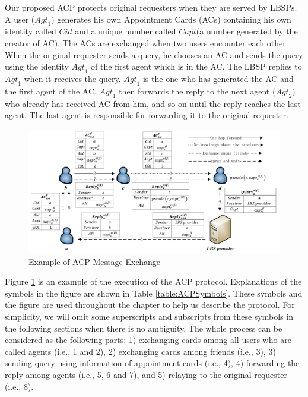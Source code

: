 \documentclass[conference]{IEEEtran}
\begin{document}
\noindent Our proposed ACP protects original requesters when they are served by LBSPs. A user (${Agt}_{1}$) generates his own Appointment Cards (ACs) containing his own identity called $Cid$ and a unique number called $Capt$(a number generated by the creator of AC). The ACs are exchanged when two users encounter each other. When the original requester sends a query, he chooses an AC and sends the query using the identity ${Agt}_{1}$ of the first agent which is in the AC. The LBSP replies to ${Agt}_{1}$ when it receives the query. ${Agt}_{1}$ is the one who has generated the AC and the first agent of the AC. ${Agt}_{1}$ then forwards the reply to the next agent (${Agt}_{2}$) who already has received AC from him, and so on until the reply reaches the last agent. The last agent is responsible for forwarding it to the original requester.

\begin{figure}
  \centering 
  \includegraphics[width=6.0in]{figures/IEEEExampleofACPMessageExchange.png}
  \caption{Example of ACP Message Exchange} 
  \label{fig:EoACPME} %
\end{figure}


Figure \ref{fig:EoACPME} is an example of the execution of the ACP protocol. Explanations of the symbols in the figure are shown in Table \ref{table:ACPSymbols}. These symbols and the figure are used throughout the chapter to help us describe the protocol. For simplicity, we will omit some superscripts and subscripts from these symbols in the following sections when there is no ambiguity. The whole process can be considered as the following parts: 1) exchanging cards among all users who are called agents (i.e., 1 and 2), 2) exchanging cards among friends (i.e., 3), 3) sending query using information of appointment cards (i.e., 4), 4) forwarding the reply among agents (i.e., 5, 6 and 7), and 5) relaying to the original requester (i.e., 8). 
\end{document}
